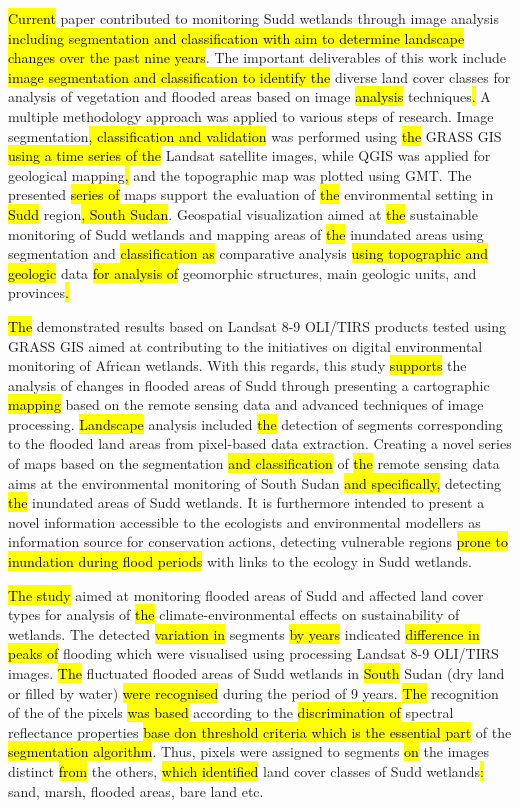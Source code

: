 \documentclass[sustainability,article,submit,pdftex,moreauthors]{Definitions/mdpi}
\begin{document}
\hl{Current} paper contributed to monitoring Sudd wetlands through\hl{ }image analysis \hl{including segmentation and classification with aim to determine landscape changes over the past nine years}. The important deliverables of this work include \hl{image segmentation and classification to identify the } diverse land cover classes for analysis of vegetation\hl{ }and flooded areas based on image \hl{analysis} techniques\hl{. }A multiple methodology approach was applied to various steps of research.\hl{ }Image segmentation\hl{, classification and validation }was performed using \hl{the }GRASS GIS \hl{using a time series of the} Landsat satellite images, while QGIS was applied for geological mapping\hl{, }and the topographic map was plotted using GMT. The presented\hl{ series of }maps\hl{ }support the evaluation of \hl{the }environmental setting in \hl{Sudd }region\hl{, South Sudan}. Geospatial visualization aimed at \hl{the }sustainable monitoring of Sudd wetlands and\hl{ }mapping areas of\hl{ the} inundated areas using\hl{ }segmentation and \hl{classification as }comparative analysis \hl{using topographic and geologic } data \hl{for analysis of }geomorphic structures, main geologic units, and provinces\hl{.} 

\hl{The }demonstrated results based on Landsat 8-9 OLI/TIRS products tested using GRASS GIS aimed at contributing to the initiatives on digital environmental monitoring of African wetlands. With this regards, this study \hl{supports} the analysis of changes in flooded areas of Sudd through presenting a cartographic \hl{mapping} based on the remote sensing data and advanced techniques of image processing. \hl{Landscape} analysis included \hl{the }detection of segments corresponding to the flooded land areas from pixel-based data extraction. Creating a novel series of maps based on the segmentation \hl{and classification }of \hl{the }remote sensing data\hl{ }aims at the environmental monitoring of South Sudan\hl{ and specifically, }detecting \hl{the }inundated areas of Sudd wetlands. It is furthermore intended to present a novel information accessible to the ecologists and environmental modellers as information source for conservation actions, detecting vulnerable regions \hl{prone to inundation during flood periods }with links to the ecology in Sudd wetlands. 

\hl{The study }aimed at monitoring flooded areas of Sudd and affected land cover types for analysis of \hl{the }climate-environmental effects on sustainability of wetlands. The detected \hl{variation in }segments \hl{by years} indicated \hl{difference in peaks of} flooding which were visualised using processing Landsat 8-9 OLI/TIRS images. \hl{The} fluctuated flooded areas of Sudd wetlands in \hl{South }Sudan (dry land or filled by water) \hl{were recognised} during the period of 9 years. \hl{The} recognition\hl{ }of the of the pixels \hl{was based }according to the \hl{discrimination of} spectral reflectance properties\hl{ base don threshold criteria which is the essential part} of the \hl{segmentation algorithm}. Thus,\hl{ }pixels\hl{ }were assigned to segments\hl{ on} the images distinct \hl{from} the others, \hl{which identified} land cover classes of Sudd wetlands\hl{: }sand, marsh, flooded areas, bare land etc.
\end{document}
